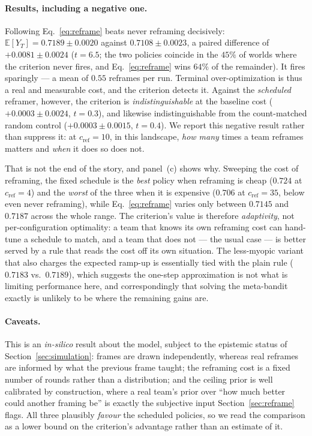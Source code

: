 \documentclass[11pt]{article}
\newcommand{\E}{\mathbb{E}}
\begin{document}
\paragraph{Results, including a negative one.} Following Eq.~\eqref{eq:reframe} beats never reframing decisively: $\E[Y_T]=0.7189\pm0.0020$ against $0.7108\pm0.0023$, a paired difference of $+0.0081\pm0.0024$ ($t=6.5$; the two policies coincide in the $45\%$ of worlds where the criterion never fires, and Eq.~\eqref{eq:reframe} wins $64\%$ of the remainder). It fires sparingly --- a mean of $0.55$ reframes per run. Terminal over-optimization is thus a real and measurable cost, and the criterion detects it. Against the \emph{scheduled} reframer, however, the criterion is \emph{indistinguishable} at the baseline cost ($+0.0003\pm0.0024$, $t=0.3$), and likewise indistinguishable from the count-matched random control ($+0.0003\pm0.0015$, $t=0.4$). We report this negative result rather than suppress it: at $c_{\text{ref}}=10$, in this landscape, \emph{how many} times a team reframes matters and \emph{when} it does so does not.

That is not the end of the story, and panel~(c) shows why. Sweeping the cost of reframing, the fixed schedule is the \emph{best} policy when reframing is cheap ($0.724$ at $c_{\text{ref}}=4$) and the \emph{worst} of the three when it is expensive ($0.706$ at $c_{\text{ref}}=35$, below even never reframing), while Eq.~\eqref{eq:reframe} varies only between $0.7145$ and $0.7187$ across the whole range. The criterion's value is therefore \emph{adaptivity}, not per-configuration optimality: a team that knows its own reframing cost can hand-tune a schedule to match, and a team that does not --- the usual case --- is better served by a rule that reads the cost off its own situation. The less-myopic variant that also charges the expected ramp-up is essentially tied with the plain rule ($0.7183$ vs.\ $0.7189$), which suggests the one-step approximation is not what is limiting performance here, and correspondingly that solving the meta-bandit exactly is unlikely to be where the remaining gains are.

\paragraph{Caveats.} This is an \emph{in-silico} result about the model, subject to the epistemic status of Section~\ref{sec:simulation}: frames are drawn independently, whereas real reframes are informed by what the previous frame taught; the reframing cost is a fixed number of rounds rather than a distribution; and the ceiling prior is well calibrated by construction, where a real team's prior over ``how much better could another framing be'' is exactly the subjective input Section~\ref{sec:reframe} flags. All three plausibly \emph{favour} the scheduled policies, so we read the comparison as a lower bound on the criterion's advantage rather than an estimate of it.
\end{document}
